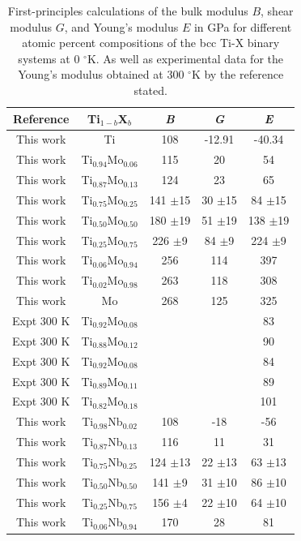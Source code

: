 \newpage
\begin{longtable}[H]{ c c c c c}
	\caption{First-principles calculations of the bulk modulus $B$, shear modulus $G$, and Young's modulus $E$ in GPa for different atomic percent compositions of the bcc Ti-X binary systems at 0 $^\circ$K. As well as experimental data for the Young's modulus obtained at 300 $^\circ$K by the reference stated.} 	\label{Ch5-table:tixelasmod} \\
	\hline
	Reference & Ti$_{1-b}$X$_b$ & \textit{B} & \textit{G} & \textit{E}\\
	\hline
	\endhead
	\hline
	\endfoot
	This work & Ti & 108 & -12.91 & -40.34\\
	This work & Ti$_{0.94}$Mo$_{0.06}$ & 115 & 20 & 54\\
	This work & Ti$_{0.87}$Mo$_{0.13}$ & 124 & 23 & 65\\
	This work & Ti$_{0.75}$Mo$_{0.25}$ & 141 $\pm$15 & 30 $\pm$15 & 84 $\pm$15\\
	This work & Ti$_{0.50}$Mo$_{0.50}$ & 180 $\pm$19 & 51 $\pm$19 & 138 $\pm$19\\
	This work & Ti$_{0.25}$Mo$_{0.75}$ & 226 $\pm$9 & 84 $\pm$9 & 224 $\pm$9\\
	This work & Ti$_{0.06}$Mo$_{0.94}$ & 256 & 114 & 397\\
	This work & Ti$_{0.02}$Mo$_{0.98}$ & 263 & 118 & 308\\
	This work & Mo & 268 & 125 & 325\\
	Expt 300 K \cite{Zhang2015} & Ti$_{0.92}$Mo$_{0.08}$ & & & 83\\
	Expt 300 K \cite{Zhang2015} & Ti$_{0.88}$Mo$_{0.12}$ & & & 90\\
	Expt 300 K \cite{Boyer1994} & Ti$_{0.92}$Mo$_{0.08}$ & & & 84\\
	Expt 300 K \cite{Boyer1994} & Ti$_{0.89}$Mo$_{0.11}$ & & & 89\\
	Expt 300 K \cite{Boyer1994} & Ti$_{0.82}$Mo$_{0.18}$ & & & 101\\
	This work & Ti$_{0.98}$Nb$_{0.02}$ & 108 & -18 & -56\\
	This work & Ti$_{0.87}$Nb$_{0.13}$ & 116 & 11 & 31\\
	This work & Ti$_{0.75}$Nb$_{0.25}$ & 124 $\pm$13 & 22 $\pm$13 & 63 $\pm$13\\
	This work & Ti$_{0.50}$Nb$_{0.50}$ & 141 $\pm$9 & 31 $\pm$10 & 86 $\pm$10\\
	This work & Ti$_{0.25}$Nb$_{0.75}$ & 156 $\pm$4 & 22 $\pm$10 & 64 $\pm$10\\
	This work & Ti$_{0.06}$Nb$_{0.94}$ & 170 & 28 & 81\\

\end{longtable}
